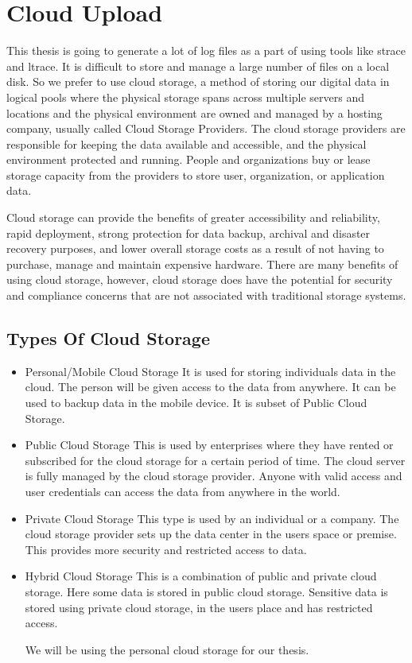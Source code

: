 \documentclass[12pt]{report}
\begin{document}
\section{Cloud Upload}

This thesis is going to generate a lot of log files as a part of using tools like strace and ltrace. It is difficult to store and manage a large number of files on a local disk. So we prefer to use cloud storage, a method of storing our digital data in logical pools where the physical storage spans across  multiple servers and locations and the physical environment are owned and managed by a hosting company, usually called Cloud Storage Providers. The cloud storage providers are responsible for keeping the data available and accessible, and the physical environment protected and running. People and organizations buy or lease storage capacity from the providers to store user, organization, or application data.

Cloud storage can provide the benefits of greater accessibility and reliability, rapid deployment, strong protection for data backup, archival and disaster recovery purposes, and lower overall storage costs as a result of not having to purchase, manage and maintain expensive hardware. There are many benefits of using cloud storage, however, cloud storage does have the potential for security and compliance concerns that are not associated with traditional storage systems.

\subsection{Types Of Cloud Storage}
\begin{itemize}
	\item Personal/Mobile Cloud Storage
	It is used for storing individual\textquotesingle s data in the cloud. The person will be given access to the data from anywhere. It can be used to backup data in the mobile device. It is subset of Public Cloud Storage.
	
	\item Public Cloud Storage
	This is used by enterprises where they have rented or subscribed for the cloud storage for a certain period of time. The cloud server is fully managed by the cloud storage provider. Anyone with valid access and user credentials can access the data from anywhere in the world. 
	
	\item Private Cloud Storage
	This type is used by an individual or a company. The cloud storage provider sets up the data center in the user\textquotesingle s space or premise. This provides more security and restricted access to data.
	\item Hybrid Cloud Storage
	This is a combination of public and private cloud storage. Here some data is stored in public cloud storage. Sensitive data is stored using private cloud storage, in the user\textquotesingle s place and has restricted access.
	
	We will be using the personal cloud storage for our thesis. 
\end{itemize}
\end{document}
